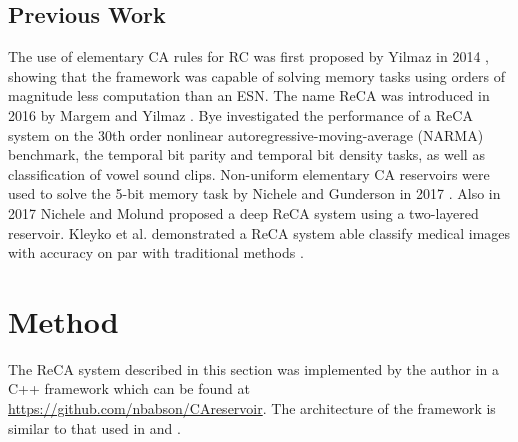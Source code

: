 \documentclass{elsarticle}
\begin{document}
\begin{multicols}{2}
\subsection{Previous Work}

The use of elementary CA rules for RC was 
   first proposed by Yilmaz in 2014 \cite{yilmaz2014reservoir}
, showing that the framework was capable of 
   solving memory tasks using orders of magnitude less computation than an ESN.
   The name ReCA was introduced in 2016 by Margem 
   and Yilmaz \cite{margem2017experimental}. Bye \cite{bye2016investigation} investigated the performance 
   of a ReCA system on the 30th order nonlinear autoregressive-moving-average 
   (NARMA) benchmark, the temporal bit parity and temporal bit density tasks, 
   as well as classification of vowel sound clips.  
      Non-uniform elementary CA reservoirs were used to solve the 5-bit memory 
      task by Nichele and Gunderson in 2017 \cite{nichele2017reservoir}. Also 
      in 2017 Nichele and Molund \cite{nichele2017deep}
proposed a deep ReCA system using a 
      two-layered reservoir. Kleyko et al. \cite{kleyko2017modality} demonstrated a ReCA system able 
      classify medical images with accuracy on par with traditional methods 
      .
 





\section{Method}\label{method}
The ReCA system described in this section was implemented by the author in a 
C++ framework which can be found at \url{https://github.com/nbabson/CAreservoir}. The 
architecture of the framework is similar to that used in  
\cite{nichele2017deep} and \cite{bye2016investigation}.


\end{multicols}
\end{document}
